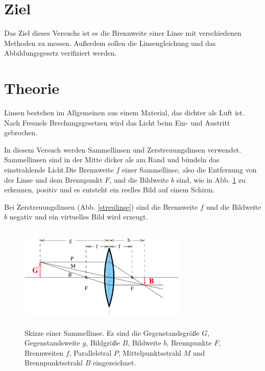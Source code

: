\section{Ziel}
Das Ziel dieses Versuchs ist es die Brennweite einer Linse mit verschiedenen Methoden zu messen. Außerdem sollen die Linsengleichung und das Abbildungsgesetz verifiziert werden.

\section{Theorie}
\label{sec:Theorie}

Linsen bestehen im Allgemeinen aus einem Material, das dichter als Luft ist.
Nach Fresnels Brechungsgesetzen wird das Licht beim Ein- und Austritt gebrochen.

\noindent In diesem Versuch werden Sammellinsen und Zerstreuungslinsen verwendet. Sammellinsen sind in der Mitte dicker als am Rand und bündeln das einstrahlende Licht.Die Brennweite $f$ einer Sammellinse, also die Entfernung von der Linse und dem Brennpunkt $F$, und die Bildweite $b$ sind, wie in Abb. \ref{sammellinse} zu erkennen, positiv und es entsteht ein reelles Bild auf einem Schirm.

\noindent Bei Zerstreuungslinsen (Abb. \ref{streulinse}) sind die Brennweite $f$ und die Bildweite $b$ negativ und ein virtuelles Bild wird erzeugt.

\begin{figure}
    \centering
    \includegraphics[width=8cm, height=5cm]{build/sammellinse.png}
    \caption{Skizze einer Sammellinse. Es sind die Gegenstandsgröße $G$, Gegenstandsweite $g$, Bildgröße $B$, Bildweite $b$, Brennpunkte $F$, Brennweiten $f$, Parallelstral $P$, Mittelpunktsstrahl $M$ und Brennpunktsstrahl $B$ eingezeichnet. \cite{V408}}
    \label{sammellinse}
\end{figure}

